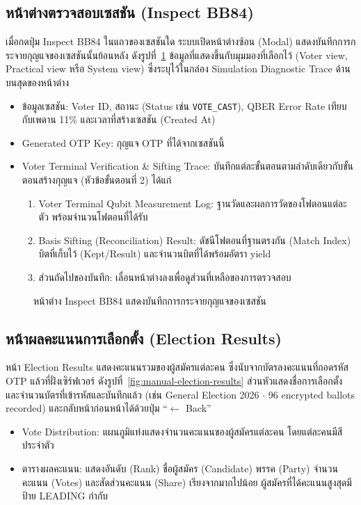 \subsection{หน้าต่างตรวจสอบเซสชัน (Inspect BB84)}
เมื่อกดปุ่ม Inspect BB84 ในแถวของเซสชันใด ระบบเปิดหน้าต่างซ้อน (Modal)
แสดงบันทึกการกระจายกุญแจของเซสชันนั้นย้อนหลัง ดังรูปที่~\ref{fig:manual-inspect}
ข้อมูลที่แสดงขึ้นกับมุมมองที่เลือกไว้ (Voter view, Practical view หรือ System view)
ซึ่งระบุไว้ในกล่อง Simulation Diagnostic Trace ด้านบนสุดของหน้าต่าง
\begin{itemize}
  \item ข้อมูลเซสชัน: Voter ID, สถานะ (Status เช่น \texttt{VOTE\_CAST}),
        QBER Error Rate เทียบกับเพดาน 11\% และเวลาที่สร้างเซสชัน (Created At)
  \item Generated OTP Key: กุญแจ OTP ที่ได้จากเซสชันนี้
  \item Voter Terminal Verification \& Sifting Trace: บันทึกแต่ละขั้นตอนตามลำดับเดียวกับขั้นตอนสร้างกุญแจ
        (หัวข้อขั้นตอนที่ 2) ได้แก่
        \begin{enumerate}
          \item Voter Terminal Qubit Measurement Log: ฐานวัดและผลการวัดของโฟตอนแต่ละตัว
                พร้อมจำนวนโฟตอนที่ได้รับ
          \item Basis Sifting (Reconciliation) Result: ดัชนีโฟตอนที่ฐานตรงกัน (Match Index)
                บิตที่เก็บไว้ (Kept/Result) และจำนวนบิตที่ได้พร้อมอัตรา yield
          \item ส่วนถัดไปของบันทึก: เลื่อนหน้าต่างลงเพื่อดูส่วนที่เหลือของการตรวจสอบ
        \end{enumerate}
\end{itemize}

\begin{figure}[htbp]
\centering
{}
\caption{หน้าต่าง Inspect BB84 แสดงบันทึกการกระจายกุญแจของเซสชัน}
\label{fig:manual-inspect}
\end{figure}

\subsection{หน้าผลคะแนนการเลือกตั้ง (Election Results)}

หน้า Election Results แสดงคะแนนรวมของผู้สมัครแต่ละคน
ซึ่งนับจากบัตรลงคะแนนที่ถอดรหัส OTP แล้วที่ฝั่งเซิร์ฟเวอร์ ดังรูปที่~\ref{fig:manual-election-results}
ส่วนหัวแสดงชื่อการเลือกตั้งและจำนวนบัตรที่เข้ารหัสและบันทึกแล้ว
(เช่น General Election 2026 $\cdot$ 96 encrypted ballots recorded)
และกลับหน้าก่อนหน้าได้ด้วยปุ่ม ``$\leftarrow$ Back''
\begin{itemize}
  \item Vote Distribution: แผนภูมิแท่งแสดงจำนวนคะแนนของผู้สมัครแต่ละคน โดยแต่ละคนมีสีประจำตัว
  \item ตารางผลคะแนน: แสดงอันดับ (Rank) ชื่อผู้สมัคร (Candidate) พรรค (Party)
        จำนวนคะแนน (Votes) และสัดส่วนคะแนน (Share) เรียงจากมากไปน้อย
        ผู้สมัครที่ได้คะแนนสูงสุดมีป้าย LEADING กำกับ
\end{itemize}

